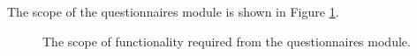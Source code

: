 The scope of the questionnaires module is shown in Figure \ref{fig:questionnaires_scope}. 

\begin{figure}[htb]
\begin{center}
\end{center}
\caption{The scope of functionality required from the questionnaires module. \label{fig:questionnaires_scope}}
\end{figure}



